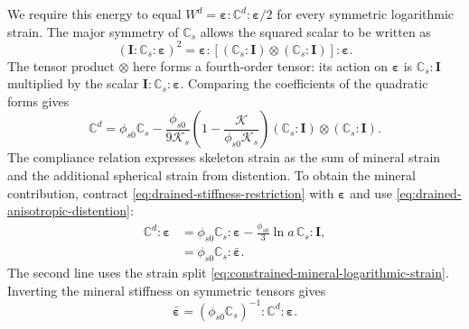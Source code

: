 We require this energy to equal
\(W^d=\mathbf\varepsilon:\mathbb{C}^d:\mathbf\varepsilon/2\)
for every symmetric logarithmic strain. The major symmetry of
\(\mathbb{C}_s\) allows the squared scalar to be written as
\begin{equation}
 \left(\mathbf I:\mathbb{C}_s:\mathbf\varepsilon\right)^2
 =\mathbf\varepsilon:
 \left[(\mathbb{C}_s:\mathbf I)\otimes(\mathbb{C}_s:\mathbf I)\right]
 :\mathbf\varepsilon.
 \label{eq:drained-energy-dyadic-identity}
\end{equation}
The tensor product \(\otimes\) here forms a fourth-order tensor: its
action on \(\mathbf\varepsilon\) is \(\mathbb{C}_s:\mathbf I\)
multiplied by the scalar \(\mathbf I:\mathbb{C}_s:\mathbf\varepsilon\).
Comparing the coefficients of the quadratic forms gives
\begin{equation}
 \mathbb{C}^d=\phi_{s0}\mathbb{C}_s
 -\frac{\phi_{s0}}{9\mathcal{K}_s}\left(1-\frac{\mathcal{K}}{\phi_{s0}\mathcal{K}_s}\right)
    (\mathbb{C}_s:\mathbf I)\otimes(\mathbb{C}_s:\mathbf I).
 \label{eq:drained-stiffness-restriction}
\end{equation}
The compliance relation expresses skeleton strain as the sum of mineral
strain and the additional spherical strain from distention. To obtain the
mineral contribution, contract
\eqref{eq:drained-stiffness-restriction} with \(\mathbf\varepsilon\)
and use \eqref{eq:drained-anisotropic-distention}:
\begin{align}
 \mathbb{C}^d:\mathbf\varepsilon
 &=\phi_{s0}\mathbb{C}_s:\mathbf\varepsilon
   -\frac{\phi_{s0}}3\ln a\,\mathbb{C}_s:\mathbf I,
 \label{eq:drained-stress-distention-split}\\
 &=\phi_{s0}\mathbb{C}_s:\bar{\mathbf\varepsilon}.
 \label{eq:drained-mineral-logarithmic-stress}
\end{align}
The second line uses the strain split
\eqref{eq:constrained-mineral-logarithmic-strain}. Inverting the mineral
stiffness on symmetric tensors gives
\begin{equation}
 \bar{\mathbf\varepsilon}
 =(\phi_{s0}\mathbb{C}_s)^{-1}:\mathbb{C}^d:\mathbf\varepsilon.
 \label{eq:drained-mineral-strain-from-stress}
\end{equation}

